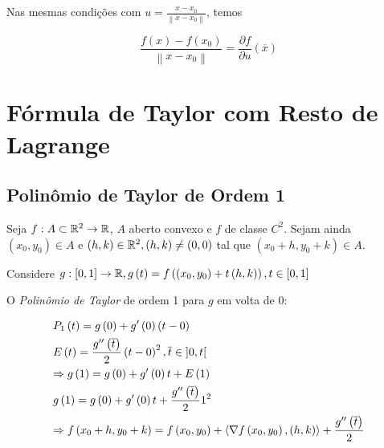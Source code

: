 \documentclass{book}
\begin{document}
\begin{cor}
Nas mesmas condi\c c\~oes com $u = \frac{{x - x_0 }}
{{\left\| {x - x_0 } \right\|}}$, temos

\[
\frac{{f\left( x \right) - f\left( {x_0 } \right)}}
{{\left\| {x - x_0 } \right\|}} = \frac{{\partial f}}
{{\partial u}}\left( {\overline x } \right)
\]

\end{cor}

\section{F\'ormula de Taylor com Resto de Lagrange}\label{sec18a}

\subsection{Polin\^omio de Taylor de Ordem 1}

Seja $f:A \subset \mathbb{R}^2 \to \mathbb{R}$, $A$ aberto convexo e $f$ de classe $C^2$. Sejam ainda $\left( {x_0 ,y_0 } \right) \in A$ e $\left( {h,k} \right) \in \mathbb{R}^2 ,\left( {h,k} \right) \ne \left( {0,0} \right)$ tal que $\left( {x_0  + h,y_0  + k} \right) \in A$.

Considere $g:\left[ {0,1} \right] \to \mathbb{R},g\left( t \right) = f\left( {\left( {x_0 ,y_0 } \right) + t\left( {h,k} \right)} \right),t \in \left[ {0,1} \right]$

O \textit{Polin\^omio de Taylor} de ordem 1 para $g$ em volta de $0$:

\[
\begin{gathered}
  P_1 \left( t \right) = g\left( 0 \right) + g'\left( 0 \right)\left( {t - 0} \right) \hfill \\
E\left( t \right) = \frac{{g''\left( {\overline t } \right)}}
{2}\left( {t - 0} \right)^2 ,\overline t  \in \left] {0,t} \right[ \hfill \\
   \Rightarrow g\left( 1 \right) = g\left( 0 \right) + g'\left( 0 \right)t + E\left( 1 \right) \hfill \\
  g\left( 1 \right) = g\left( 0 \right) + g'\left( 0 \right)t + \frac{{g''\left( {\overline t } \right)}}
{2}1^2  \hfill \\
   \Rightarrow f\left( {x_0  + h,y_0  + k} \right) = f\left( {x_0 ,y_0 } \right) + \left\langle {\nabla f\left( {x_0 ,y_0 } \right),\left( {h,k} \right)} \right\rangle  + \frac{{g''\left( {\overline t } \right)}}
{2} \hfill \\
\end{gathered}
\]
\end{document}
